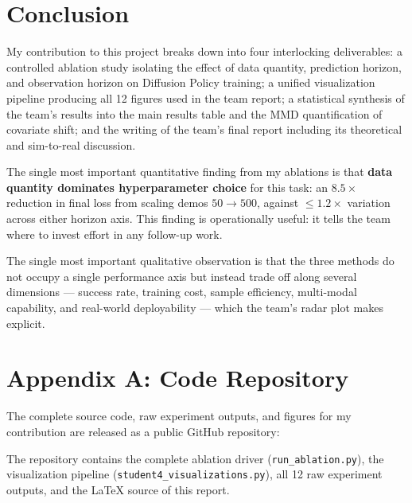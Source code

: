 \documentclass[11pt]{article}
\begin{document}
\section{Conclusion}

My contribution to this project breaks down into four interlocking
deliverables: a controlled ablation study isolating the effect of
data quantity, prediction horizon, and observation horizon on
Diffusion Policy training; a unified visualization pipeline producing
all 12 figures used in the team report; a statistical synthesis of
the team's results into the main results table and the MMD
quantification of covariate shift; and the writing of the team's
final report including its theoretical and sim-to-real discussion.

The single most important quantitative finding from my ablations is
that \textbf{data quantity dominates hyperparameter choice} for this
task: an $8.5\times$ reduction in final loss from scaling demos $50
\to 500$, against $\le 1.2\times$ variation across either horizon
axis. This finding is operationally useful: it tells the team where
to invest effort in any follow-up work.

The single most important qualitative observation is that the three
methods do not occupy a single performance axis but instead trade off
along several dimensions --- success rate, training cost, sample
efficiency, multi-modal capability, and real-world deployability ---
which the team's radar plot makes explicit.

\section*{Appendix A: Code Repository}

The complete source code, raw experiment outputs, and figures for my
contribution are released as a public GitHub repository:

\begin{center}
\end{center}

The repository contains the complete ablation driver
(\texttt{run\_ablation.py}), the visualization pipeline
(\texttt{student4\_visualizations.py}), all 12 raw experiment
outputs, and the LaTeX source of this report.
\end{document}
